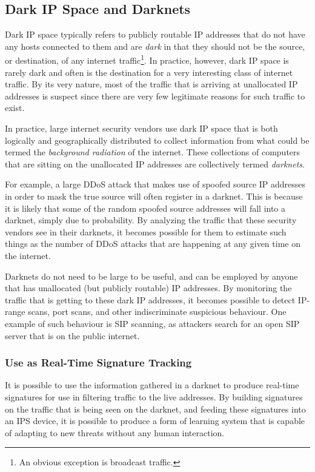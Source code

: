 \documentclass{article}
\theoremstyle{remark}
\theoremstyle{definition}
\theoremstyle{definition}
\theoremstyle{definition}
\begin{document}
\subsection{Dark IP Space and Darknets}
Dark IP space typically refers to publicly routable IP addresses that do not have any hosts connected to them and are \emph{dark} in that they should not be the source, or destination, of any internet traffic\footnote{An obvious exception is broadcast traffic.}. In practice, however, dark IP space is rarely dark and often is the destination for a very interesting class of internet traffic. By its very nature, most of the traffic that is arriving at unallocated IP addresses is suspect since there are very few legitimate reasons for such traffic to exist.

In practice, large internet security vendors use dark IP space that is both logically and geographically distributed to collect information from what could be termed the \emph{background radiation} of the internet. These collections of computers that are sitting on the unallocated IP addresses are collectively termed \emph{darknets}. 

For example, a large DDoS attack that makes use of spoofed source IP addresses in order to mask the true source will often register in a darknet. This is because it is likely that some of the random spoofed source addresses will fall into a darknet, simply due to probability. By analyzing the traffic that these security vendors see in their darknets, it becomes possible for them to estimate such things as the number of DDoS attacks that are happening at any given time on the internet.

Darknets do not need to be large to be useful, and can be employed by anyone that has unallocated (but publicly routable) IP addresses. By monitoring the traffic that is getting to these dark IP addresses, it becomes possible to detect IP-range scans, port scans, and other indiscriminate suspicious behaviour. One example of such behaviour is SIP scanning, as attackers search for an open SIP server that is on the public internet.

\subsubsection{Use as Real-Time Signature Tracking}
It is possible to use the information gathered in a darknet to produce real-time signatures for use in filtering traffic to the live addresses. By building signatures on the traffic that is being seen on the darknet, and feeding these signatures into an IPS device, it is possible to produce a form of learning system that is capable of adapting to new threats without any human interaction.
\end{document}
